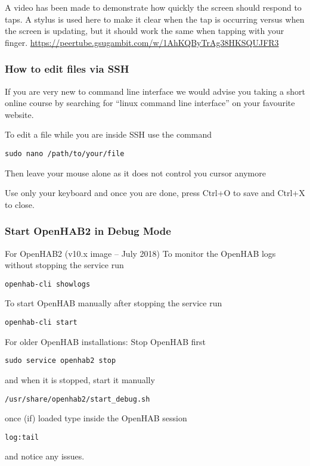 A video has been made to demonstrate how quickly the screen should respond to
taps. A stylus is used here to make it clear when the tap is occurring versus
when the screen is updating, but it should work the same when tapping with your
finger. \url{https://peertube.gsugambit.com/w/1AhKQByTrAg38HKSQUJFR3}

\subsubsection{How to edit files via SSH}
If you are very new to command line interface we would advise you taking a
short online course by searching for ``linux command line interface'' on your
favourite website.

To edit a file while you are inside SSH use the command

\texttt{sudo nano /path/to/your/file}

Then leave your mouse alone as it does not control you cursor anymore

Use only your keyboard and once you are done, press Ctrl+O to save and Ctrl+X to close.

\subsubsection{Start OpenHAB2 in Debug Mode}

For OpenHAB2 (v10.x image -- July 2018)
To monitor the OpenHAB logs without stopping the service run

\texttt{openhab-cli showlogs}

To start OpenHAB manually after stopping the service run

\texttt{openhab-cli start}

For older OpenHAB installations:
Stop OpenHAB first

\texttt{sudo service openhab2 stop}

and when it is stopped, start it manually

\texttt{/usr/share/openhab2/start\_debug.sh}

once (if) loaded type inside the OpenHAB session

\texttt{log:tail}

and notice any issues.
